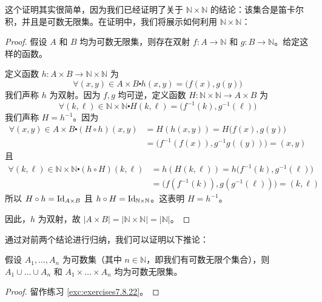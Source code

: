 这个证明其实很简单，因为我们已经证明了关于 $\mathbb{N} \times \mathbb{N}$ 的结论：该集合是笛卡尔积，并且是可数无限集。在证明中，我们将展示如何利用 $\mathbb{N} \times \mathbb{N}$：

\begin{proof}
    假设 $A$ 和 $B$ 均为可数无限集，则存在双射 $ f : A \to \mathbb{N}$ 和 $g : B \to \mathbb{N}$。给定这样的函数。

    定义函数 $h : A \times B \to \mathbb{N} \times \mathbb{N}$ 为
    \[\forall (x, y) \in A \times B \centerdot h(x, y) = \big(f(x), g(y)\big)\]
    我们声称 $h$ 为双射。因为 $f, g$ 均可逆，定义函数 $H : \mathbb{N} \times \mathbb{N} \to A \times B$ 为
    \[\forall (k, \ell) \in \mathbb{N} \times \mathbb{N} \centerdot H(k, \ell) = \big(f^{-1}(k), g^{-1}(\ell)\big)\]
    我们声称 $H = h^{-1}$。因为
    \begin{align*}
        \forall (x, y) \in A \times B \centerdot (H \circ h)(x, y) & = H(h(x, y)) = H \big(f(x), g(y)\big)           \\
                                                                   & = \big(f^{-1}(f(x)), g^{-1}g((y))\big) = (x, y)
    \end{align*}
    且
    \begin{align*}
        \forall (k, \ell) \in \mathbb{N} \times \mathbb{N} \centerdot (h \circ H)(k, \ell) & = h(H(k, \ell)) = h\big(f^{-1}(k), g^{-1}(\ell)\big)  \\
                                                                                           & = \big(f(f^{-1}(k)), g(g^{-1}(\ell))\big) = (k, \ell)
    \end{align*}
    所以 $H \circ h = \text{Id}_{A \times B}$ 且 $h \circ H = \text{Id}_{\mathbb{N} \times \mathbb{N}}$。这表明 $H = h^{-1}$。

    因此，$h$ 为双射，故 $|A \times B| = |\mathbb{N} \times \mathbb{N}| = |\mathbb{N}|$。
\end{proof}

通过对前两个结论进行归纳，我们可以证明以下推论：

\begin{corollary}\label{corollary7.6.21}
    假设 $A_1, \dots , A_n$ 为可数集（其中 $n \in \mathbb{N}$，即我们有可数无限个集合），则 $A_1 \cup \dots \cup A_n$ 和 $A_1 \times \dots \times A_n$ 均为可数无限集。
\end{corollary}

\begin{proof}
    留作练习 \ref{exc:exercises7.8.22}。
\end{proof}

